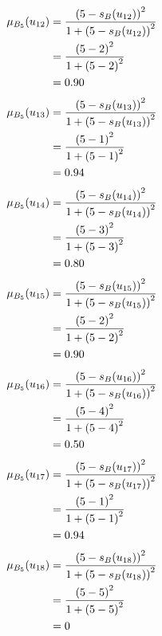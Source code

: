\documentclass[a4paper,openany]{book}
\begin{document}
				\begin{align}
					\mu_{B_5}(u_{12}) &= \frac{\left(5-s_B(u_{12})\right)^2}{1 + \left(5-s_B(u_{12})\right)^2}\\
					&= \frac{\left(5-2\right)^2}{1 + \left(5-2\right)^2} \notag \\
					&= 0.90 \notag
				\end{align}
				\begin{align}
					\mu_{B_5}(u_{13}) &= \frac{\left(5-s_B(u_{13})\right)^2}{1 + \left(5-s_B(u_{13})\right)^2}\\
					&= \frac{\left(5-1\right)^2}{1 + \left(5-1\right)^2} \notag \\
					&= 0.94 \notag
				\end{align}
				\begin{align}
					\mu_{B_5}(u_{14}) &= \frac{\left(5-s_B(u_{14})\right)^2}{1 + \left(5-s_B(u_{14})\right)^2}\\
					&= \frac{\left(5-3\right)^2}{1 + \left(5-3\right)^2} \notag \\
					&= 0.80 \notag
				\end{align}
				\begin{align}
					\mu_{B_5}(u_{15}) &= \frac{\left(5-s_B(u_{15})\right)^2}{1 + \left(5-s_B(u_{15})\right)^2}\\
					&= \frac{\left(5-2\right)^2}{1 + \left(5-2\right)^2} \notag \\
					&= 0.90 \notag
				\end{align}
				\begin{align}
					\mu_{B_5}(u_{16}) &= \frac{\left(5-s_B(u_{16})\right)^2}{1 + \left(5-s_B(u_{16})\right)^2}\\
					&= \frac{\left(5-4\right)^2}{1 + \left(5-4\right)^2} \notag \\
					&= 0.50 \notag
				\end{align}
				\begin{align}
					\mu_{B_5}(u_{17}) &= \frac{\left(5-s_B(u_{17})\right)^2}{1 + \left(5-s_B(u_{17})\right)^2}\\
					&= \frac{\left(5-1\right)^2}{1 + \left(5-1\right)^2} \notag \\
					&= 0.94 \notag
				\end{align}
				\begin{align}
					\mu_{B_5}(u_{18}) &= \frac{\left(5-s_B(u_{18})\right)^2}{1 + \left(5-s_B(u_{18})\right)^2}\\
					&= \frac{\left(5-5\right)^2}{1 + \left(5-5\right)^2} \notag \\
					&= 0 \notag
				\end{align}
\end{document}
